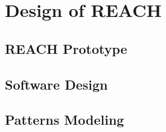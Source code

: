 \section{Design of REACH}

\subsection{REACH Prototype}

\subsection{Software Design}

\subsection{Patterns Modeling}
